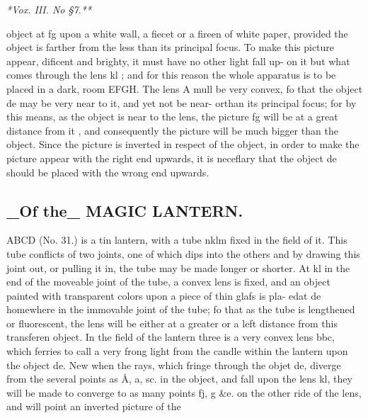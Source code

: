{\small\itshape **Vox. III. No §7.**\par}\medskip
object at fg upon a white wall, a fiecet or a fireen of white paper, provided the object is farther from the less than its principal focus. To make this picture appear, dificent and brighty, it must have no other light fall up- on it but what comes through the lens kl ; and for this reason the whole apparatus is to be placed in a dark, room EFGH. The lens A mull be very convex, fo that the object de may be very near to it, and yet not be near- orthan its principal focus; for by this means, as the object is near to the lens, the picture fg will be at a great distance from it , and consequently the picture will be much bigger than the object. Since the picture is inverted in respect of the object, in order to make the picture appear with the right end upwards, it is neceflary that the object de should be placed with the wrong end upwards.\par\medskip
\subsection*{\_Of the\_ MAGIC LANTERN.}
ABCD (No. 31.) is a tin lantern, with a tube nklm fixed in the field of it. This tube conflicts of two joints, one of which dips into the others and by drawing this joint out, or pulling it in, the tube may be made longer or shorter. At kl in the end of the moveable joint of the tube, a convex lens is fixed, and an object painted with transparent colors upon a piece of thin glafs is pla- edat de homewhere in the immovable joint of the tube; fo that as the tube is lengthened or fluorescent, the lens will be either at a greater or a left distance from this transferen object. In the field of the lantern three is a very convex lens bbc, which ferries to call a very frong light from the candle within the lantern upon the object de. New when the rays, which fringe through the objet de, diverge from the several points as Å, a, sc. in the object, and fall upon the lens kl, they will be made to converge to as many points fj, g \&e. on the other ride of the lens, and will point an inverted picture of the\par\medskip
